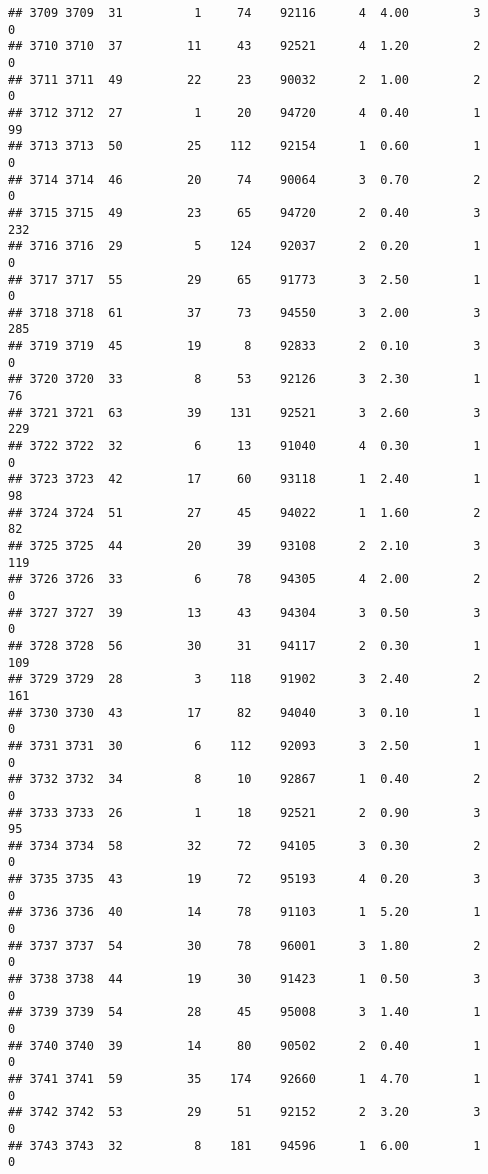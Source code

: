 \documentclass[
]{article}
\begin{document}
\begin{verbatim}
## 3709 3709  31          1     74    92116      4  4.00         3        0
## 3710 3710  37         11     43    92521      4  1.20         2        0
## 3711 3711  49         22     23    90032      2  1.00         2        0
## 3712 3712  27          1     20    94720      4  0.40         1       99
## 3713 3713  50         25    112    92154      1  0.60         1        0
## 3714 3714  46         20     74    90064      3  0.70         2        0
## 3715 3715  49         23     65    94720      2  0.40         3      232
## 3716 3716  29          5    124    92037      2  0.20         1        0
## 3717 3717  55         29     65    91773      3  2.50         1        0
## 3718 3718  61         37     73    94550      3  2.00         3      285
## 3719 3719  45         19      8    92833      2  0.10         3        0
## 3720 3720  33          8     53    92126      3  2.30         1       76
## 3721 3721  63         39    131    92521      3  2.60         3      229
## 3722 3722  32          6     13    91040      4  0.30         1        0
## 3723 3723  42         17     60    93118      1  2.40         1       98
## 3724 3724  51         27     45    94022      1  1.60         2       82
## 3725 3725  44         20     39    93108      2  2.10         3      119
## 3726 3726  33          6     78    94305      4  2.00         2        0
## 3727 3727  39         13     43    94304      3  0.50         3        0
## 3728 3728  56         30     31    94117      2  0.30         1      109
## 3729 3729  28          3    118    91902      3  2.40         2      161
## 3730 3730  43         17     82    94040      3  0.10         1        0
## 3731 3731  30          6    112    92093      3  2.50         1        0
## 3732 3732  34          8     10    92867      1  0.40         2        0
## 3733 3733  26          1     18    92521      2  0.90         3       95
## 3734 3734  58         32     72    94105      3  0.30         2        0
## 3735 3735  43         19     72    95193      4  0.20         3        0
## 3736 3736  40         14     78    91103      1  5.20         1        0
## 3737 3737  54         30     78    96001      3  1.80         2        0
## 3738 3738  44         19     30    91423      1  0.50         3        0
## 3739 3739  54         28     45    95008      3  1.40         1        0
## 3740 3740  39         14     80    90502      2  0.40         1        0
## 3741 3741  59         35    174    92660      1  4.70         1        0
## 3742 3742  53         29     51    92152      2  3.20         3        0
## 3743 3743  32          8    181    94596      1  6.00         1        0

\end{verbatim}
\end{document}
